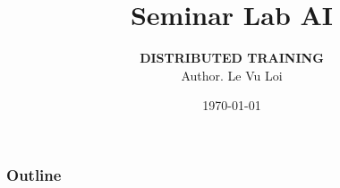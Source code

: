 \documentclass[11pt]{beamer}
\def\mydate{\leavevmode\hbox{\bfseries\the\day/\twodigits\month/\twodigits\year}}
\def\twodigits#1{\ifnum#1<10 0\fi\the#1}
\begin{document}
\captionsenglish
\dateUSenglish
\author[Le Vu Loi]{
	\begin{center}
		{\bfseries\fontsize{16pt}{\baselineskip}\selectfont DISTRIBUTED TRAINING} \\[10pt]
		{Author. Le Vu Loi}
	\end{center}
}
	\title[]{\bfseries\fontsize{14}{\baselineskip}\selectfont Seminar Lab AI\vspace{5pt}}
	\date[\mydate]{\today}
	
\begin{frame}[plain]
	\maketitle
\end{frame}
\begin{frame}[plain]
	\frametitle{Outline}
	\tableofcontents
\end{frame}
\end{document}
